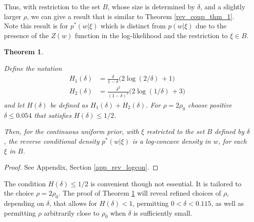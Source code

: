 \documentclass{article}
\numberwithin{equation}{section}
\theoremstyle{Lemma}
\theoremstyle{Corollary}
\newtheorem{corollary}{Corollary}
\theoremstyle{Theorem}
\newtheorem{theorem}{Theorem}
\theoremstyle{Remark}
\begin{document}
Thus, with restriction to the set $B$, whose size is determined by $\delta$, and a slightly larger $\rho$, we can give a result that is similar to Theorem \ref{rev_coup_thm_1}. Note this result is for $p^{*}(w|\xi)$ which is distinct from $p(w|\xi)$ due to the presence of the $Z(w)$ function in the log-likelihood and the restriction to $\xi \in B$.

\begin{theorem}\label{rev_coup_thm_2}

    Define the notation
    \begin{align}
       H_{1}(\delta)&= \frac{\delta}{1-\delta}\Big(2\log(2/\delta)\,+1\Big)\\
       H_{2}(\delta)&= \frac{\delta^2}{(1-\delta)^2}\Big(2\log(1/\delta)\,+3\Big)
    \end{align}
and let $H(\delta)$ be defined as $H_1(\delta)+H_2(\delta)$.  For $\rho=2\rho_0$ choose positive $\delta\le 0.054$ that satisfies $H(\delta) \le 1/2$.

Then, for the continuous uniform prior, with $\xi$ restricted to the set $B$ defined by $\delta$, 
the reverse conditional density $p^{*}(w|\xi)$ is a log-concave density in $w$, for each $\xi$ in $B$.
\end{theorem}
\begin{proof}
    See Appendix, Section \ref{app_rev_logcon}.
\end{proof}


The condition $H(\delta) \le 1/2$ is convenient though not essential. It is tailored to the choice $\rho=2\rho_0$. The proof of Theorem \ref{rev_coup_thm_2} will reveal refined choices of $\rho$, depending on $\delta$, that allows for $H(\delta) < 1$, permitting $0 < \delta < 0.115$, as well as permitting $\rho$ arbitrarily close to $\rho_0$ when $\delta$ is sufficiently small.
\end{document}
